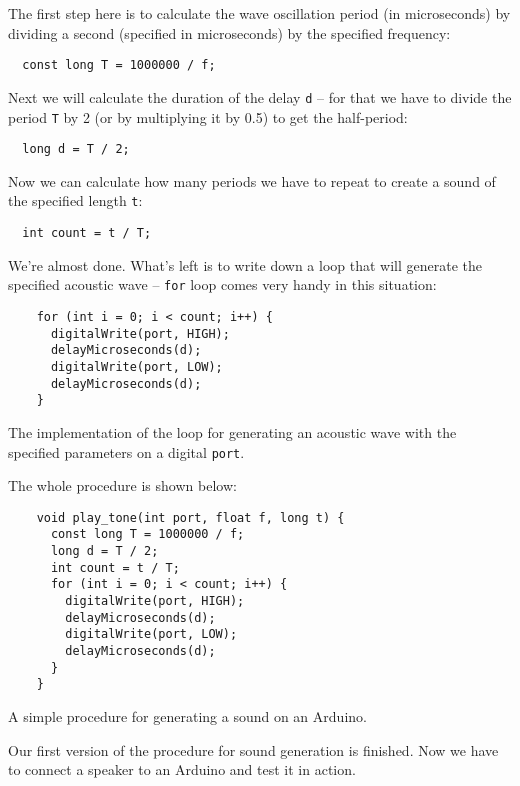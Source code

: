 \documentclass[../sparc.tex]{subfiles}
\begin{document}
The first step here is to calculate the wave oscillation period (in
microseconds) by dividing a second (specified in microseconds) by the specified
frequency:

\begin{verbatim}
  const long T = 1000000 / f;
\end{verbatim}

Next we will calculate the duration of the delay \texttt{d} -- for that we have
to divide the period \texttt{T} by 2 (or by multiplying it by 0.5) to get the
half-period:

\begin{verbatim}
  long d = T / 2;
\end{verbatim}

Now we can calculate how many periods we have to repeat to create a sound of the
specified length \texttt{t}:

\begin{verbatim}
  int count = t / T;
\end{verbatim}

We're almost done.  What's left is to write down a loop that will generate the
specified acoustic wave -- \texttt{for} loop comes very handy in this situation:

\begin{listing}[H]
  \begin{verbatim}
    for (int i = 0; i < count; i++) {
      digitalWrite(port, HIGH);
      delayMicroseconds(d);
      digitalWrite(port, LOW);
      delayMicroseconds(d);
    }
  \end{verbatim}
  \label{listing:play-tone-cycle}
  \caption{The implementation of the loop for generating an acoustic wave with
    the specified parameters on a digital \texttt{port}.}
\end{listing}

The whole procedure is shown below:
\begin{listing}[H]
  \begin{verbatim}
    void play_tone(int port, float f, long t) {
      const long T = 1000000 / f;
      long d = T / 2;
      int count = t / T;
      for (int i = 0; i < count; i++) {
        digitalWrite(port, HIGH);
        delayMicroseconds(d);
        digitalWrite(port, LOW);
        delayMicroseconds(d);
      }
    }
  \end{verbatim}
  \label{listing:play-tone-procedure}
  \caption{A simple procedure for generating a sound on an Arduino.}
\end{listing}

Our first version of the procedure for sound generation is finished.  Now we
have to connect a speaker to an Arduino and test it in action.

\end{document}
